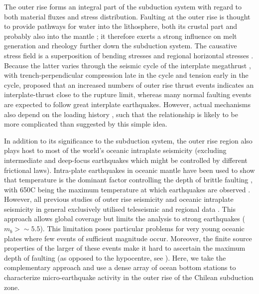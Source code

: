 \documentclass[reviewcopy]{elsart}
\begin{document}
The outer rise forms an integral part of the subduction system with
regard to both material fluxes and stress distribution. Faulting at
the outer rise is thought to provide pathways for water into the
lithosphere, both its crustal part \citep{kirby96} and probably also
into the mantle  \citep{ranero03}; it therefore exerts a strong
influence on melt generation and rheology further down the subduction
system.  The causative stress field is a superposition of bending
stresses and regional horizontal stresses \citep{christensen88}.
Because the latter varies through the seismic cycle of the interplate
megathrust \citep[e.g.][]{taylor96}, with trench-perpendicular
compression late in the cycle and tension early in the cycle,
\citet{christensen88} proposed that an 
increased numbers of outer rise thrust events indicates an
interplate-thrust close to the rupture limit, whereas many normal faulting events
are expected to follow great interplate earthquakes. However, actual
mechanisms also depend on the loading history \citep{mueller96b}, such that the
relationship is likely to be more complicated than suggested by this
simple idea.

In addition to
its significance to the subduction system, the outer rise region also
plays host to most of the world's oceanic intraplate  seismicity
(excluding intermediate and deep-focus earthquakes which might be
controlled by different frictional laws).  
Intra-plate earthquakes in oceanic mantle have been used to show that
temperature is the dominant factor controlling the
depth of brittle faulting \citep{wiens83}, with 650\dg C being the
maximum temperature at which earthquakes are observed
\citep{mckenzie05}.
However, all previous studies of outer rise seismicity and oceanic
intraplate seismicity in general exclusively utilised teleseismic and
regional data \citep[e.g.][]{wiens83,christensen88}. This approach allows global
  coverage but limits the analysis to strong earthquakes ($m_b>\sim
  5.5$). This limitation poses particular problems for very young
  oceanic plates where few events of sufficient magnitude
  occur.
Moreover, the finite source properties of the larger of these events
make it hard to ascertain the maximum depth of faulting (as opposed to
the hypocentre, see \citet{tichelaar92}).
Here, we take the complementary approach and use a dense array of
ocean bottom stations to characterize micro-earthquake activity in the
outer rise of the Chilean subduction zone.
\end{document}
